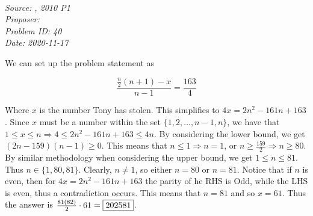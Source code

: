 \SSbreak\\
\emph{Source: \Cbmoo, 2010 P1}\\
\emph{Proposer: \Pss}\\
\emph{Problem ID: 40}\\
\emph{Date: 2020-11-17}\\
\SSbreak
        
\bigskip
   
\begin{solution}\hfil\medskip 
   
    We can set up the problem statement as 
    
    \begin{equation*}
        \frac{\frac{n}{2}(n+1)-x}{n-1}=\frac{163}{4}
    \end{equation*}
                
    Where \(x\) is the number Tony has stolen.
	This simplifies to \(4x=2n^2-161n+163\).
	Since \(x\) must be a number within the set \(\{1,2,\ldots,n-1,n\}\), we have that \(1\leq x\leq n\Rightarrow 4\leq 2n^2-161n+163\leq4n\).
	By considering the lower bound, we get $(2n-159)(n-1)\geq 0$.
	This means that \(n\leq 1\Rightarrow n=1\), or \(n\geq \frac{159}{2}\Rightarrow n\geq 80\).
	By similar methodology when considering the upper bound, we get \(1\leq n\leq 81\).
	Thus \(n\in\{1,80,81\}\).
	Clearly, \(n\ne 1\), so either \(n=80\) or \(n=81\).
	Notice that if \(n\) is even, then for \(4x=2n^2-161n+163\) the parity of he RHS is Odd, while the LHS is even, thus a contradiction occurs.
	This means that \(n=81\) and so \(x=61\). Thus the answer is \(\frac{81(82)}{2}\cdot61=\fbox{202581}\).
\end{solution}\bigskip